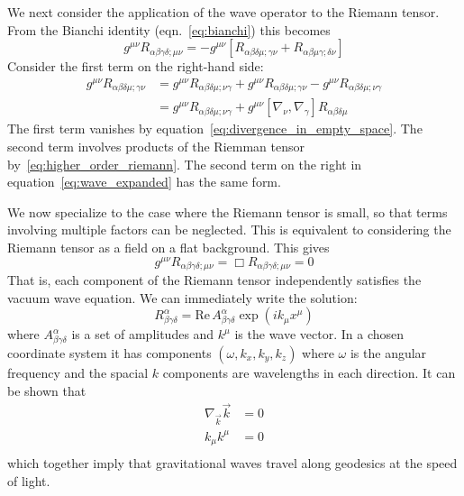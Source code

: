 We next consider the application of the wave operator to the Riemann
tensor.  From the Bianchi identity (eqn.~\ref{eq:bianchi}) this becomes
%
\begin{equation*}
\label{eq:wave_expanded}
g^{\mu\nu} R_{\alpha\beta\gamma\delta;\mu\nu}
= - g^{\mu\nu}
\left[R_{\alpha\beta\delta\mu;\gamma\nu}
+ R_{\alpha\beta\mu\gamma;\delta\nu} \right]
\end{equation*}
%
Consider the first term on the right-hand side:
%
\begin{align*}
g^{\mu\nu} R_{\alpha\beta\delta\mu;\gamma\nu}
&= g^{\mu\nu} R_{\alpha\beta\delta\mu;\nu\gamma}
+ g^{\mu\nu} R_{\alpha\beta\delta\mu;\gamma\nu}
- g^{\mu\nu} R_{\alpha\beta\delta\mu;\nu\gamma} \\
&= g^{\mu\nu} R_{\alpha\beta\delta\mu;\nu\gamma}
+ g^{\mu\nu} 
\left[\nabla_\nu,\nabla_\gamma\right] R_{\alpha\beta\delta\mu}
\end{align*}
%
The first term vanishes by
equation~\ref{eq:divergence_in_empty_space}.  The second term involves
products of the Riemman tensor by~\ref{eq:higher_order_riemann}.  The
second term on the right in equation~\ref{eq:wave_expanded} has the
same form.

We now specialize to the case where the Riemann tensor is small, so
that terms involving multiple factors can be neglected.  This is
equivalent to considering the Riemann tensor as a field on a flat
background.  This gives
%
\begin{equation}
\label{eq:riemann_wave}
g^{\mu\nu}
R_{\alpha\beta\gamma\delta;\mu\nu}
=
\Box R_{\alpha\beta\gamma\delta;\mu\nu}
= 0
\end{equation}
%
That is, each component of the Riemann tensor independently 
satisfies the vacuum wave equation.  We can immediately write the
solution:
%
\begin{equation}
R^\alpha_{\beta\gamma\delta} = 
\textrm{Re}\, A^\alpha_{\beta\gamma\delta} \exp(i k_\mu x^\mu)
\end{equation}
%
where $A^\alpha_{\beta\gamma\delta}$ is a set of amplitudes and
$k^\mu$ is the wave vector.  In a chosen coordinate system it has
components $(\omega, k_x, k_y, k_z)$ where $\omega$ is the angular
frequency and the spacial $k$ components are wavelengths in each
direction.  It can be shown that 
%
\begin{align*}
\nabla_{\vec k} \vec{k} &= 0 \\
k_\mu k^\mu &= 0 \\
\end{align*}
%
which together imply that gravitational waves travel along geodesics 
at the speed of light.


